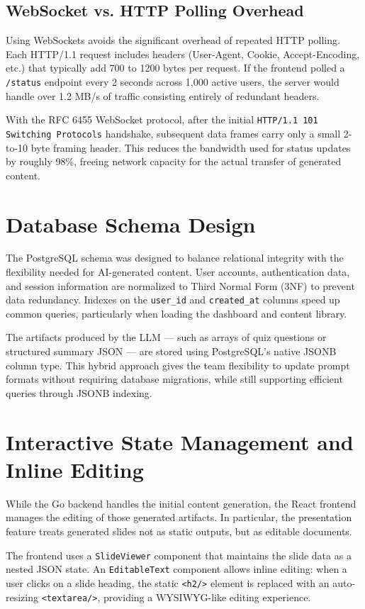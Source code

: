 \subsection{WebSocket vs. HTTP Polling Overhead}
Using WebSockets avoids the significant overhead of repeated HTTP polling. Each HTTP/1.1 request includes headers (User-Agent, Cookie, Accept-Encoding, etc.) that typically add 700 to 1200 bytes per request. If the frontend polled a \texttt{/status} endpoint every 2 seconds across 1,000 active users, the server would handle over 1.2 MB/s of traffic consisting entirely of redundant headers.

With the RFC 6455 WebSocket protocol, after the initial \texttt{HTTP/1.1 101 Switching Protocols} handshake, subsequent data frames carry only a small 2-to-10 byte framing header. This reduces the bandwidth used for status updates by roughly 98\%, freeing network capacity for the actual transfer of generated content.

\section{Database Schema Design}
The PostgreSQL schema was designed to balance relational integrity with the flexibility needed for AI-generated content. User accounts, authentication data, and session information are normalized to Third Normal Form (3NF) to prevent data redundancy. Indexes on the \texttt{user\_id} and \texttt{created\_at} columns speed up common queries, particularly when loading the dashboard and content library.

The artifacts produced by the LLM — such as arrays of quiz questions or structured summary JSON — are stored using PostgreSQL's native JSONB column type. This hybrid approach gives the team flexibility to update prompt formats without requiring database migrations, while still supporting efficient queries through JSONB indexing.

\section{Interactive State Management and Inline Editing}
While the Go backend handles the initial content generation, the React frontend manages the editing of those generated artifacts. In particular, the presentation feature treats generated slides not as static outputs, but as editable documents.

The frontend uses a \texttt{SlideViewer} component that maintains the slide data as a nested JSON state. An \texttt{EditableText} component allows inline editing: when a user clicks on a slide heading, the static \verb|<h2/>| element is replaced with an auto-resizing \verb|<textarea/>|, providing a WYSIWYG-like editing experience.

